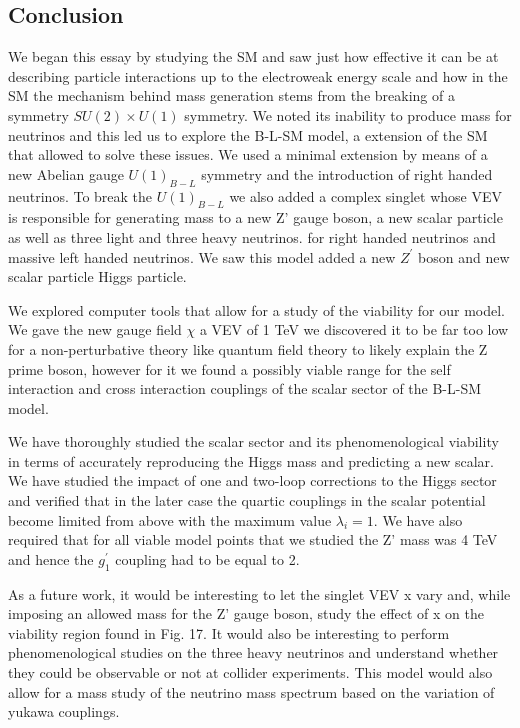 \documentclass[12pt]{article}
\begin{document}
\newpage
 

\subsection{Conclusion} 
We began this essay by studying the SM and saw just how effective it can be at describing particle interactions up to the electroweak energy scale and how in the SM the mechanism behind mass generation stems from the breaking of a symmetry $SU(2) \times U(1)$ symmetry. We noted its inability to produce mass for neutrinos and this led us to explore the B-L-SM model, a extension of the SM that allowed to solve these issues. We used a minimal extension by means of a new Abelian gauge $U(1)_{B-L}$ symmetry and the introduction of right handed neutrinos. To break the $U(1)_{B-L}$ we also added a complex singlet whose VEV is responsible for generating mass to a new Z' gauge boson, a new scalar particle as well as three light and three heavy neutrinos. for right handed neutrinos and massive left handed neutrinos. We saw this model added a new $Z^\prime$ boson and  new scalar particle Higgs particle. 

We explored computer tools that allow for a study of the viability for our model. We gave the new gauge field $\chi$ a VEV of 1 TeV we discovered it to be far too low for a non-perturbative theory like quantum field theory to likely explain the Z prime boson, however for it we found a possibly viable range for the self interaction and cross interaction couplings of  the scalar sector of the B-L-SM model.

We have thoroughly studied the scalar sector and its phenomenological viability in terms of accurately reproducing the Higgs mass and predicting a new scalar. We have studied the impact of one and two-loop corrections to the Higgs sector and verified that in the later case the quartic couplings in the scalar potential become limited from above with the maximum value $\lambda_i = 1$. We have also required that for all viable model points that we studied the Z' mass was 4 TeV and hence the $g_1^\prime$ coupling had to be equal to 2.

As a future work, it would be interesting to let the singlet VEV x vary and, while imposing an allowed mass for the Z' gauge boson, study the effect of x on the viability region found in Fig. 17. It would also be interesting to perform phenomenological studies on the three heavy neutrinos and understand whether they could be observable or not at collider experiments. 
This model would also allow for a mass study of the neutrino mass spectrum based on the variation of yukawa couplings. 
\end{document}
